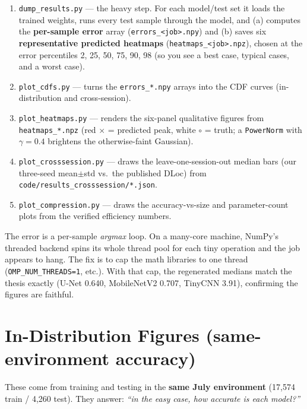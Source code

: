 \documentclass[11pt]{article}
\begin{document}
\begin{enumerate}[leftmargin=*]
  \item \texttt{dump\_results.py} --- the heavy step. For each model/test set it loads the trained
        weights, runs every test sample through the model, and (a) computes the \textbf{per-sample
        error} array (\texttt{errors\_<job>.npy}) and (b) saves six \textbf{representative predicted
        heatmaps} (\texttt{heatmaps\_<job>.npz}), chosen at the error percentiles 2, 25, 50, 75, 90, 98
        (so you see a best case, typical cases, and a worst case).
  \item \texttt{plot\_cdfs.py} --- turns the \texttt{errors\_*.npy} arrays into the CDF curves
        (in-distribution and cross-session).
  \item \texttt{plot\_heatmaps.py} --- renders the six-panel qualitative figures from
        \texttt{heatmaps\_*.npz} (red $\times$ = predicted peak, white $\circ$ = truth; a
        \texttt{PowerNorm} with $\gamma = 0.4$ brightens the otherwise-faint Gaussian).
  \item \texttt{plot\_crosssession.py} --- draws the leave-one-session-out median bars (our three-seed
        mean$\pm$std vs.\ the published DLoc) from \texttt{code/results\_crosssession/*.json}.
  \item \texttt{plot\_compression.py} --- draws the accuracy-vs-size and parameter-count plots from the
        verified efficiency numbers.
\end{enumerate}

\begin{madebox}
The error is a per-sample \emph{argmax} loop. On a many-core machine, NumPy's threaded backend spins its
whole thread pool for each tiny operation and the job appears to hang. The fix is to cap the math
libraries to one thread (\texttt{OMP\_NUM\_THREADS=1}, etc.). With that cap, the regenerated medians
match the thesis exactly (U-Net 0.640, MobileNetV2 0.707, TinyCNN 3.91), confirming the figures are
faithful.
\end{madebox}

\section{In-Distribution Figures (same-environment accuracy)}

These come from training and testing in the \textbf{same July environment} (17{,}574 train / 4{,}260
test). They answer: \emph{``in the easy case, how accurate is each model?''}
\end{document}

